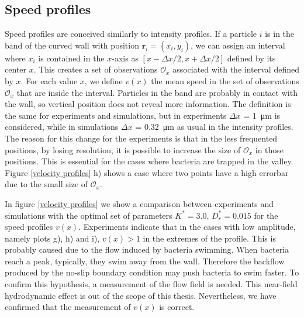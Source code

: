 \subsection{Speed profiles}

Speed profiles are conceived similarly to intensity profiles. If a particle $i$ is in the band of the curved wall with position $\textbf{r}_i =(x_i, y_i)$, we can assign an interval where $x_i$ is contained in the $x$-axis as $[x-\Delta x/2,x+\Delta x/2]$ defined by its center $x$. This creates a set of observations $\mathcal{O}_x$ associated with the interval defined by $x$. For each value $x$, we define $v(x)$ the mean speed in the set of observations $\mathcal{O}_x$ that are inside the interval. Particles in the band are probably in contact with the wall, so vertical position does not reveal more information. The definition is the same for experiments and simulations, but in experiments $\Delta x $ = \SI{1}{\micro\meter} is considered, while in simulations $\Delta x $ = \SI{0.32}{\micro\meter} as usual in the intensity profiles. The reason for this change for the experiments is that in the less frequented positions, by losing resolution, it is possible to increase the size of $\mathcal{O}_x$ in those positions. This is essential for the cases where bacteria are trapped in the valley. Figure \ref{velocity profiles} h) shows a case where two points have a high errorbar due to the small size of $\mathcal{O}_x$.


In figure \ref{velocity profiles} we show a comparison between experiments and simulations with the optimal set of parameters $K^*=3.0$, $D_r^*=0.015$ for the speed profiles $v(x)$. Experiments indicate that in the cases with low amplitude, namely plots g), h) and i), $v(x)>1$ in the extremes of the profile. This is probably caused due to the flow induced by bacteria swimming. When bacteria reach a peak, typically, they swim away from the wall. Therefore the backflow produced by the no-slip boundary condition may push bacteria to swim faster. To confirm this hypothesis, a measurement of the flow field is needed. This near-field hydrodynamic effect is out of the scope of this thesis. Nevertheless, we have confirmed that the measurement of $v(x)$ is correct.

